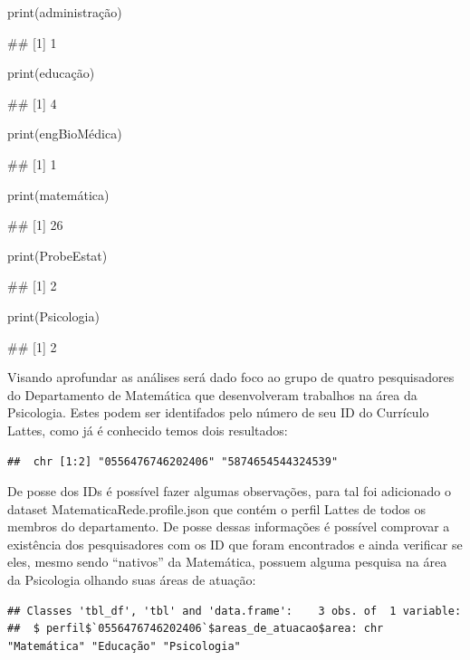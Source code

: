 \documentclass[]{article}
\newenvironment{Shaded}{\begin{snugshade}}{\end{snugshade}}
\newcommand{\KeywordTok}[1]{\textcolor[rgb]{0.13,0.29,0.53}{\textbf{#1}}}
\newcommand{\DataTypeTok}[1]{\textcolor[rgb]{0.13,0.29,0.53}{#1}}
\newcommand{\StringTok}[1]{\textcolor[rgb]{0.31,0.60,0.02}{#1}}
\newcommand{\OperatorTok}[1]{\textcolor[rgb]{0.81,0.36,0.00}{\textbf{#1}}}
\newcommand{\NormalTok}[1]{#1}
\begin{document}
print(administração)

\#\# {[}1{]} 1

print(educação)

\#\# {[}1{]} 4

print(engBioMédica)

\#\# {[}1{]} 1

print(matemática)

\#\# {[}1{]} 26

print(ProbeEstat)

\#\# {[}1{]} 2

print(Psicologia)

\#\# {[}1{]} 2

Visando aprofundar as análises será dado foco ao grupo de quatro
pesquisadores do Departamento de Matemática que desenvolveram trabalhos
na área da Psicologia. Estes podem ser identifados pelo número de seu ID
do Currículo Lattes, como já é conhecido temos dois resultados:

\begin{verbatim}
##  chr [1:2] "0556476746202406" "5874654544324539"
\end{verbatim}

De posse dos IDs é possível fazer algumas observações, para tal foi
adicionado o dataset MatematicaRede.profile.json que contém o perfil
Lattes de todos os membros do departamento. De posse dessas informações
é possível comprovar a existência dos pesquisadores com os ID que foram
encontrados e ainda verificar se eles, mesmo sendo ``nativos'' da
Matemática, possuem alguma pesquisa na área da Psicologia olhando suas
áreas de atuação:

\begin{Shaded}
\end{Shaded}

\begin{verbatim}
## Classes 'tbl_df', 'tbl' and 'data.frame':    3 obs. of  1 variable:
##  $ perfil$`0556476746202406`$areas_de_atuacao$area: chr  "Matemática" "Educação" "Psicologia"
\end{verbatim}

\begin{Shaded}
\end{Shaded}
\end{document}
